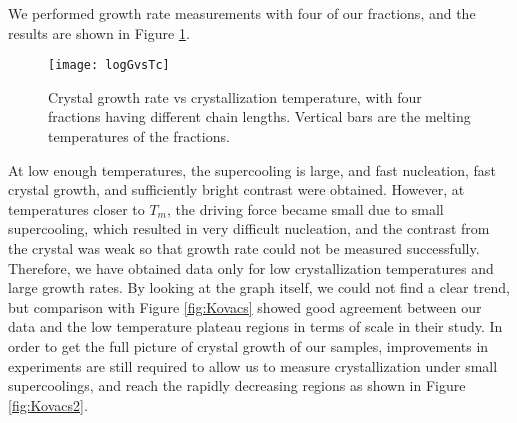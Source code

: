 We performed growth rate measurements with four of our fractions, and the results are shown in Figure \ref{fig:logGvsTc}.

\begin{figure}[H]
	\center
	\texttt{[image: logGvsTc]}
	\caption{Crystal growth rate vs crystallization temperature, with four fractions having different chain lengths. Vertical bars are the melting temperatures of the fractions.}
	\label{fig:logGvsTc}
\end{figure}

At low enough temperatures, the supercooling is large, and fast nucleation, fast crystal growth, and sufficiently bright contrast were obtained. However, at temperatures closer to $T_{m}$, the driving force became small due to small supercooling, which resulted in very difficult nucleation, and the contrast from the crystal was weak so that growth rate could not be measured successfully. Therefore, we have obtained data only for low crystallization temperatures and large growth rates. By looking at the graph itself, we could not find a clear trend, but comparison with Figure \ref{fig:Kovacs} showed good agreement between our data and the low temperature plateau regions in terms of scale in their study. In order to get the full picture of crystal growth of our samples, improvements in experiments are still required to allow us to measure crystallization under small supercoolings, and reach the rapidly decreasing regions as shown in Figure \ref{fig:Kovacs2}.